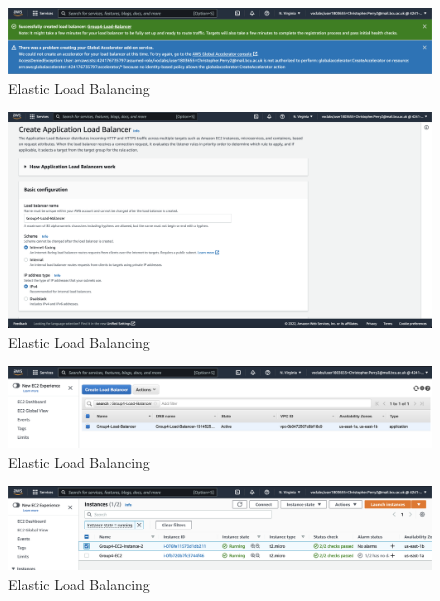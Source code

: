 \begin{figure}[!htbp]
    \centering
    \includegraphics[width=\textwidth]{resources/elb/elb-accelerator.png}
    \caption{Elastic Load Balancing}
    \label{fig:elb-accelerator}
\end{figure}

\begin{figure}[!htbp]
    \centering
    \includegraphics[width=\textwidth]{resources/elb/elb-basic-config.png}
    \caption{Elastic Load Balancing}
    \label{fig:elb-basic-config}
\end{figure}
\begin{figure}[!htbp]
    \centering
    \includegraphics[width=\textwidth]{resources/elb/elb-created.png}
    \caption{Elastic Load Balancing}
    \label{fig:elb-created}
\end{figure}
\begin{figure}[!htbp]
    \centering
    \includegraphics[width=\textwidth]{resources/elb/elb-instance-2-created.png}
    \caption{Elastic Load Balancing}
    \label{fig:elb-instance-2-create}
\end{figure}
